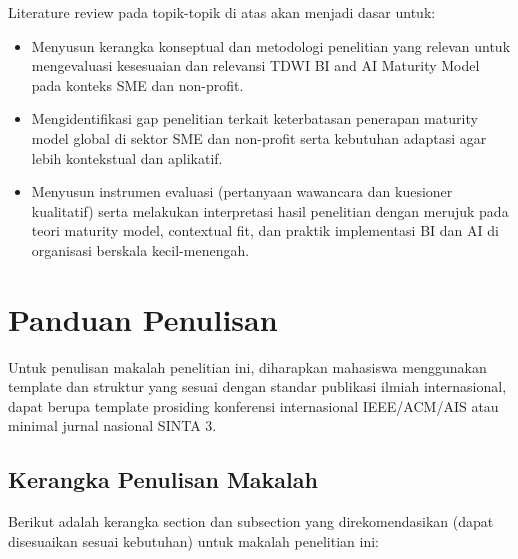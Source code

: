 \documentclass{article}
\begin{document}
Literature review pada topik-topik di atas akan menjadi dasar untuk:
\begin{itemize}
	\item Menyusun kerangka konseptual dan metodologi penelitian yang relevan untuk mengevaluasi kesesuaian dan relevansi TDWI BI and AI Maturity Model pada konteks SME dan non-profit.
	
	\item Mengidentifikasi gap penelitian terkait keterbatasan penerapan maturity model global di sektor SME dan non-profit serta kebutuhan adaptasi agar lebih kontekstual dan aplikatif.
	
	\item Menyusun instrumen evaluasi (pertanyaan wawancara dan kuesioner kualitatif) serta melakukan interpretasi hasil penelitian dengan merujuk pada teori maturity model, contextual fit, dan praktik implementasi BI dan AI di organisasi berskala kecil-menengah.
\end{itemize}

\section{Panduan Penulisan}
Untuk penulisan makalah penelitian ini, diharapkan mahasiswa menggunakan template dan struktur yang sesuai dengan standar publikasi ilmiah internasional, dapat berupa template prosiding konferensi internasional IEEE/ACM/AIS atau minimal jurnal nasional SINTA 3.


\subsection{Kerangka Penulisan Makalah}
Berikut adalah kerangka section dan subsection yang direkomendasikan (dapat disesuaikan sesuai kebutuhan) untuk makalah penelitian ini:
\end{document}
